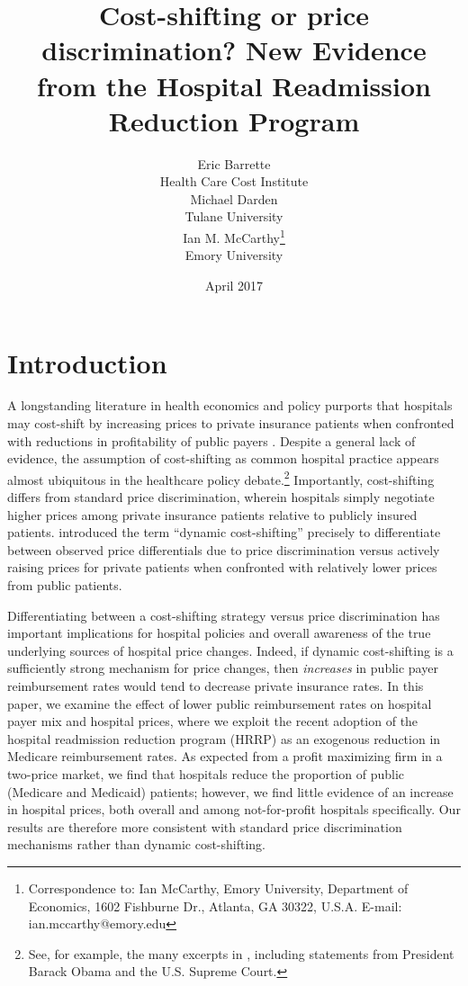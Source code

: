 \documentclass[12pt]{article}
\begin{document}
\title{Cost-shifting or price discrimination? New Evidence from the Hospital Readmission Reduction Program}
\author{%
  Eric Barrette \\[-1.5ex]
  Health Care Cost Institute \\
  Michael Darden \\[-1.5ex]
  Tulane University \\
  Ian M. McCarthy\thanks{Correspondence to: Ian McCarthy, Emory University, Department of Economics, 1602 Fishburne Dr., Atlanta, GA 30322, U.S.A. E-mail: ian.mccarthy@emory.edu} \\[-1.5ex]
  Emory University \\
}
\date{April 2017}
\maketitle

\vspace{-2ex}
\section{Introduction}
A longstanding literature in health economics and policy purports that hospitals may cost-shift by increasing prices to private insurance patients when confronted with reductions in profitability of public payers \cite{dranove1988}. Despite a general lack of evidence, the assumption of cost-shifting as common hospital practice appears almost ubiquitous in the healthcare policy debate.\footnote{See, for example, the many excerpts in \cite{dranove2013}, including statements from President Barack Obama and the U.S. Supreme Court.} Importantly, cost-shifting differs from standard price discrimination, wherein hospitals simply negotiate higher prices among private insurance patients relative to publicly insured patients. \cite{morrisey1994} introduced the term ``dynamic cost-shifting'' precisely to differentiate between observed price differentials due to price discrimination versus actively raising prices for private patients when confronted with relatively lower prices from public patients.

Differentiating between a cost-shifting strategy versus price discrimination has important implications for hospital policies and overall awareness of the true underlying sources of hospital price changes. Indeed, if dynamic cost-shifting is a sufficiently strong mechanism for price changes, then \textit{increases} in public payer reimbursement rates would tend to decrease private insurance rates. In this paper, we examine the effect of lower public reimbursement rates on hospital payer mix and hospital prices, where we exploit the recent adoption of the hospital readmission reduction program (HRRP) as an exogenous reduction in Medicare reimbursement rates. As expected from a profit maximizing firm in a two-price market, we find that hospitals reduce the proportion of public (Medicare and Medicaid) patients; however, we find little evidence of an increase in hospital prices, both overall and among not-for-profit hospitals specifically. Our results are therefore more consistent with standard price discrimination mechanisms rather than dynamic cost-shifting.
\end{document}
